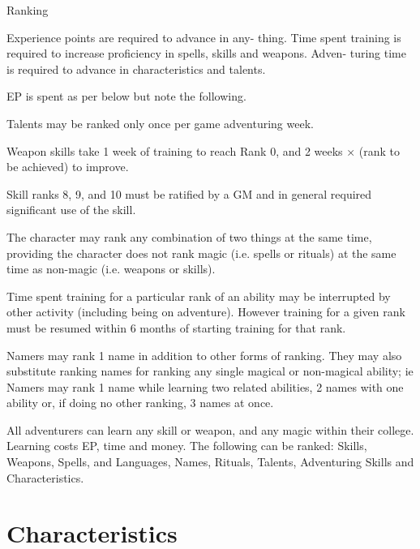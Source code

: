\begin{Chapter}{Ranking}

Experience  points  are  required  to  advance  in  any-
thing.  Time  spent  training  is  required  to  increase 
proficiency  in  spells,  skills  and  weapons.  Adven-
turing time is required to advance in characteristics 
and talents. 

EP is spent as per below but note the following.  

\begin{Itemize}
  
\item Talents may be ranked only once per game adventuring week.

\item Weapon skills take 1 week of training to reach Rank 0, and 2
  weeks × (rank to be achieved) to improve.

\item Skill ranks 8, 9, and 10 must be ratified by a GM and in general
  required significant use of the skill.

\item The character may rank any combination of two things at the same
  time, providing the character does not rank magic (i.e.  spells or
  rituals) at the same time as non-magic (i.e. weapons or skills).

\item Time spent training for a particular rank of an ability may be
  interrupted by other activity (including being on adventure).
  However training for a given rank must be resumed within 6 months of
  starting training for that rank.

\item Namers may rank 1 name in addition to other forms of
  ranking. They may also substitute ranking names for ranking any
  single magical or non-magical ability; ie Namers may rank 1 name
  while learning two related abilities, 2 names with one ability or,
  if doing no other ranking, 3 names at once.

\end{Itemize}

All adventurers can learn any skill or weapon, and any magic within
their college. Learning costs EP, time and money.  The following can
be ranked: Skills, Weapons, Spells, and Languages, Names, Rituals,
Talents, Adventuring Skills and Characteristics.

\section{Characteristics}


\end{Chapter}
